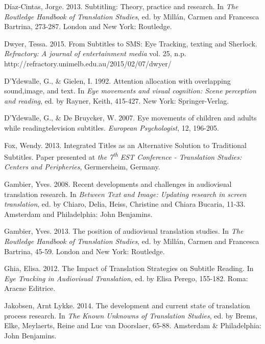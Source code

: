 \documentclass[output=paper]{langsci/langscibook}
\begin{document}
D\'{i}az-Cintas, Jorge. 2013. Subtitling: Theory, practice and research.  In \textit{The Routledge Handbook of Translation Studies}, ed. by Mill\'{a}n, Carmen and Francesca Bartrina, 273-287. London and New York: Routledge.



Dwyer, Tessa. 2015. From Subtitles to SMS: Eye Tracking, texting and Sherlock. \textit{Refractory: A journal of entertainment media} vol. 25, n.p. http://refractory.unimelb.edu.au/2015/02/07/dwyer/ 



D'Ydewalle, G., \& Gielen, I. 1992. Attention allocation with overlapping sound,image, and text. In \textit{Eye movements and visual cognition: Scene perception and reading}, ed. by Rayner, Keith, 415-427. New York: Springer-Verlag.



D'Ydewalle, G., \& De Bruycker, W. 2007. Eye movements of children and adults while readingtelevision subtitles. \textit{European Psychologist}, 12, 196-205.



Fox, Wendy. 2013. Integrated Titles as an Alternative Solution to Traditional Subtitles. Paper presented at \textit{the 7}\textit{\textsuperscript{th}}\textit{ EST Conference - Translation Studies: Centers and Peripheries}, Germersheim, Germany.



Gambier, Yves. 2008. Recent developments and challenges in audiovisual translation research. In \textit{Between Text and Image: Updating research in screen translation}, ed. by Chiaro, Delia, Heiss, Christine and Chiara Bucaria, 11-33. Amsterdam and Philadelphia: John Benjamins. 



Gambier, Yves. 2013. The position of audiovisual translation studies. In \textit{The Routledge Handbook of Translation Studies}, ed. by Mill\'{a}n, Carmen and Francesca Bartrina, 45-59. London and New York: Routledge.



Ghia, Elisa. 2012. The Impact of Translation Strategies on Subtitle Reading. In \textit{Eye Tracking in Audiovisual Translation}, ed. by Elisa Perego, 155-182. Roma: Aracne Editrice. 



Jakobsen, Arnt Lykke. 2014. The development and current state of translation process research. In \textit{The Known Unknowns of Translation Studies}, ed. by Brems, Elke, Meylaerts, Reine and Luc van Doorslaer, 65-88. Amsterdam \& Philadelphia: John Benjamins.
\end{document}
